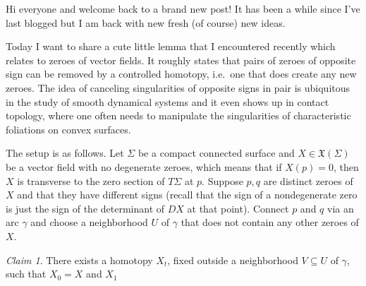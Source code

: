 \documentclass[a4paper, 12pt]{article}
\theoremstyle{definition}
\theoremstyle{plain}
\theoremstyle{remark}
\newtheorem{claim}[definition]{Claim}
\begin{document}
Hi everyone and welcome back to a brand new post! It has been a while since I've last blogged but I am back with new fresh (of course) new ideas.

Today I want to share a cute little lemma that I encountered recently which relates to zeroes of vector fields. It roughly states that pairs of zeroes of opposite sign can be removed by a controlled homotopy, i.e.\ one that does create any new zeroes. The idea of canceling singularities of opposite signs in pair is ubiquitous in the study of smooth dynamical systems and it even shows up in contact topology, where one often needs to manipulate the singularities of characteristic foliations on convex surfaces.

The setup is as follows. Let \( \Sigma \) be a compact connected surface and \( X \in \mathfrak{X}(\Sigma) \) be a vector field with no degenerate zeroes, which means that if \( X(p) = 0 \), then \( X \) is transverse to the zero section of \( T \Sigma \) at \( p \). Suppose \( p, q \) are distinct zeroes of \( X \) and that they have different signs (recall that the sign of a nondegenerate zero is just the sign of the determinant of \( DX \) at that point). Connect \( p \) and \( q \) via an arc \( \gamma \) and choose a neighborhood \( U \) of \( \gamma \) that does not contain any other zeroes of \( X \).

\begin{claim}
    There exists a homotopy \( X_t \), fixed outside a neighborhood \( V \subseteq U \) of \( \gamma \), such that \( X_0 = X \) and \( X_1 \)
\end{claim}
\end{document}
